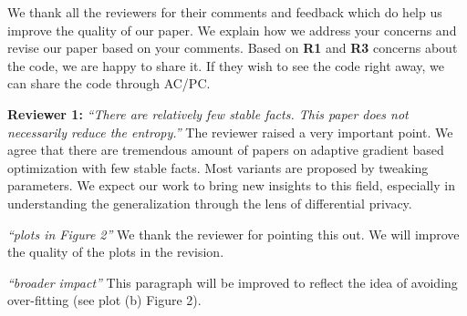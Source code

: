 \documentclass{article}
\begin{document}
We thank all the reviewers for their comments and feedback which do help us improve the quality of our paper. 
We explain how we address your concerns and revise our paper based on your comments.
Based on \textbf{R1} and \textbf{R3} concerns about the code, we are happy to share it. 
If they wish to see the code right away, we can share the code through AC/PC. \vspace{-5pt}

\textbf{Reviewer 1:}\textit{ ``There are relatively few stable facts. This paper does not necessarily reduce the entropy.''}
The reviewer raised a very important point. 
We agree that there are tremendous amount of papers on adaptive gradient based optimization with few stable facts. 
Most variants are proposed by tweaking parameters. 
We expect our work to bring new insights to this field, especially in understanding the generalization through the lens of differential privacy.\vspace{-5pt}

\textit{ ``plots in Figure 2''}
We thank the reviewer for pointing this out. We will improve the quality of the plots in the revision.\vspace{-5pt}

\textit{ ``broader impact''} This paragraph will be improved to reflect the idea of avoiding over-fitting (see plot (b) Figure 2).\vspace{-5pt}

\end{document}
